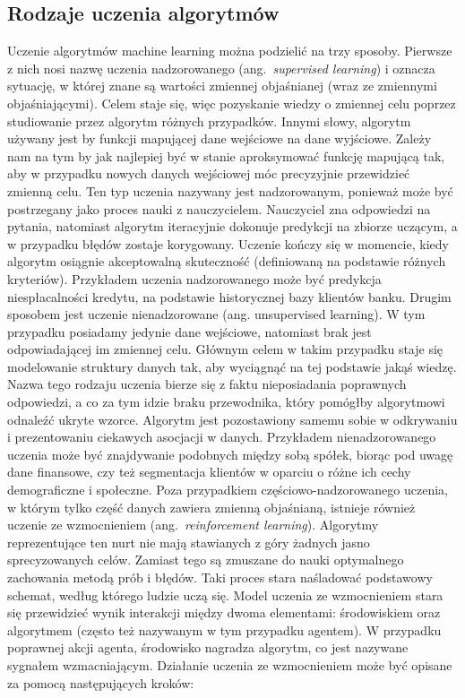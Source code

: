 \documentclass[12pt,a4paper,twoside,openany]{book}
\begin{document}
\subsection{Rodzaje uczenia algorytmów}
Uczenie algorytmów machine learning można podzielić na trzy sposoby. Pierwsze z nich nosi nazwę uczenia nadzorowanego (ang.~\textit{supervised learning}) i oznacza sytuację, w której znane są wartości zmiennej objaśnianej (wraz ze zmiennymi objaśniającymi). Celem staje się, więc pozyskanie wiedzy o zmiennej celu poprzez studiowanie przez algorytm różnych przypadków. Innymi słowy, algorytm używany jest by funkcji mapującej dane wejściowe na dane wyjściowe. Zależy nam na tym by jak najlepiej być w stanie aproksymować funkcję mapującą tak, aby w przypadku nowych danych wejściowej móc precyzyjnie przewidzieć zmienną celu. Ten typ uczenia nazywany jest nadzorowanym, ponieważ może być postrzegany jako proces nauki z nauczycielem. Nauczyciel zna odpowiedzi na pytania, natomiast algorytm iteracyjnie dokonuje predykcji na zbiorze uczącym, a w przypadku błędów zostaje korygowany. Uczenie kończy się w momencie, kiedy algorytm osiągnie akceptowalną skuteczność (definiowaną na podstawie różnych kryteriów). Przykładem uczenia nadzorowanego może być predykcja niespłacalności kredytu, na podstawie historycznej bazy klientów banku. Drugim sposobem jest uczenie nienadzorowane (ang. unsupervised learning). W tym przypadku posiadamy jedynie dane wejściowe, natomiast brak jest odpowiadającej im zmiennej celu. Głównym celem w takim przypadku staje się modelowanie struktury danych tak, aby wyciągnąć na tej podstawie jakąś wiedzę. Nazwa tego rodzaju uczenia bierze się z faktu nieposiadania poprawnych odpowiedzi, a co za tym idzie braku przewodnika, który pomógłby algorytmowi odnaleźć ukryte wzorce. Algorytm jest pozostawiony samemu sobie w odkrywaniu i prezentowaniu ciekawych asocjacji w danych. Przykładem nienadzorowanego uczenia może być znajdywanie podobnych między sobą spółek, biorąc pod uwagę dane finansowe, czy też segmentacja klientów w oparciu o różne ich cechy demograficzne i społeczne. Poza przypadkiem częściowo-nadzorowanego uczenia, w którym tylko część danych zawiera zmienną objaśnianą, istnieje również uczenie ze wzmocnieniem (ang.~\textit{reinforcement learning}). Algorytmy reprezentujące ten nurt nie mają stawianych z góry żadnych jasno sprecyzowanych celów. Zamiast tego są zmuszane do nauki optymalnego zachowania metodą prób i błędów. Taki proces stara naśladować podstawowy schemat, według którego ludzie uczą się. Model uczenia ze wzmocnieniem stara się przewidzieć wynik interakcji między dwoma elementami: środowiskiem oraz algorytmem (często też nazywanym w tym przypadku agentem). W przypadku poprawnej akcji agenta, środowisko nagradza algorytm, co jest nazywane sygnałem wzmacniającym. Działanie uczenia ze wzmocnieniem może być opisane za pomocą następujących kroków: 
\end{document}
